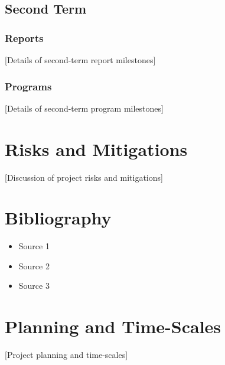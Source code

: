 \documentclass[a4paper,12pt]{article}
\begin{document}
\subsection{Second Term}
\subsubsection{Reports}
[Details of second-term report milestones]

\subsubsection{Programs}
[Details of second-term program milestones]

\section{Risks and Mitigations}
[Discussion of project risks and mitigations]

\section{Bibliography}
\begin{itemize}
  \item Source 1
  \item Source 2
  \item Source 3
\end{itemize}

\section{Planning and Time-Scales}
[Project planning and time-scales]
\end{document}
